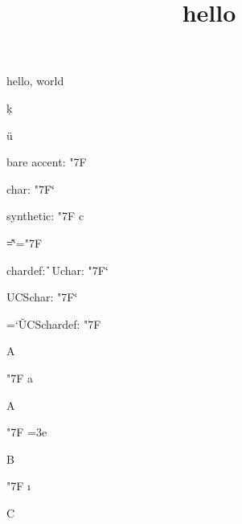\documentclass{amsart}
\title{hello}
\begin{document}
\maketitle

hello, world

\c k

\"u

bare accent: \accent"7F\relax

char: \accent"7F\char`\u\relax

synthetic: \accent"7F c\relax

\chardef\U=`\u
\chardef\D="7F

chardef: \accent\D\U

\ifTeXML
Uchar: \accent"7F\Uchar`\u
\fi

\ifx\UCSchar\undefined\else
UCSchar: \accent"7F\UCSchar`\u
\fi

\ifx\UCSchardef\undefined\else
\UCSchardef\X=`\u

UCSchardef: \accent"7F\X
\fi

\newcount\Y

\def\X{A}


\X\the\Y

\accent"7F  a

\X\the\Y

\accent"7F \def\X{B} \Y=3e

\X\the\Y

\accent"7F \def\X{C}  \i

\X\the\Y
\end{document}
